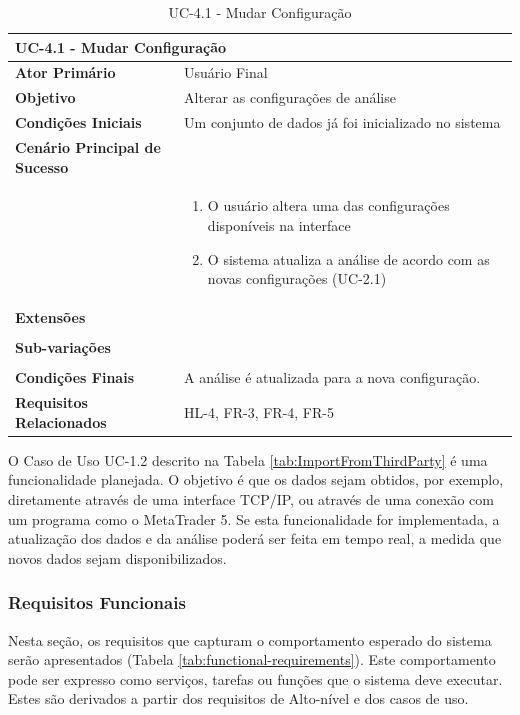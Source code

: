 \documentclass[12pt]{article}
\begin{document}
\begin{table}[H]
	\caption{UC-4.1 - Mudar Configuração}
	\label{tab:UC-4.1}
	\begin{tabular}{p{6cm} p{8cm}}
		\multicolumn{2}{l}{\large{\textbf{UC-4.1 - Mudar Configuração}}}\\
		\toprule
		\textbf{Ator Primário}		&	Usuário Final \\
		\midrule
		\textbf{Objetivo}			&	Alterar as configurações de análise \\
		\midrule
		\textbf{Condições Iniciais}	&	Um conjunto de dados já foi inicializado no sistema \\
		\midrule
		\textbf{Cenário Principal de Sucesso}	& \\
		& \begin{enumerate}
			\item O usuário altera uma das configurações disponíveis na interface
			\item O sistema atualiza a análise de acordo com as novas configurações (UC-2.1)
		\end{enumerate}\\
		\midrule
		\textbf{Extensões}	& \\
		& \\
		\midrule
		\textbf{Sub-variações} & \\
		& \\
		\midrule
		\textbf{Condições Finais} & A análise é atualizada para a nova configuração. \\
		\midrule
		\textbf{Requisitos Relacionados} & HL-4, FR-3, FR-4, FR-5\\
		\bottomrule
	\end{tabular}		
\end{table}

\endgroup

O Caso de Uso UC-1.2 descrito na Tabela \ref{tab:ImportFromThirdParty} é uma funcionalidade
planejada. O objetivo é que os dados sejam obtidos, por exemplo, diretamente através de uma
interface TCP/IP, ou através de uma conexão com um programa como o MetaTrader 5. Se esta
funcionalidade for implementada, a atualização dos dados e da análise poderá ser feita em
tempo real, a medida que novos dados sejam disponibilizados.

\subsubsection{Requisitos Funcionais}

Nesta seção, os requisitos que capturam o comportamento esperado do sistema serão
apresentados (Tabela \ref{tab:functional-requirements}). Este comportamento pode ser
expresso como serviços, tarefas ou funções que o sistema deve executar.
Estes são derivados a partir dos requisitos de Alto-nível e dos casos de uso.
\end{document}
